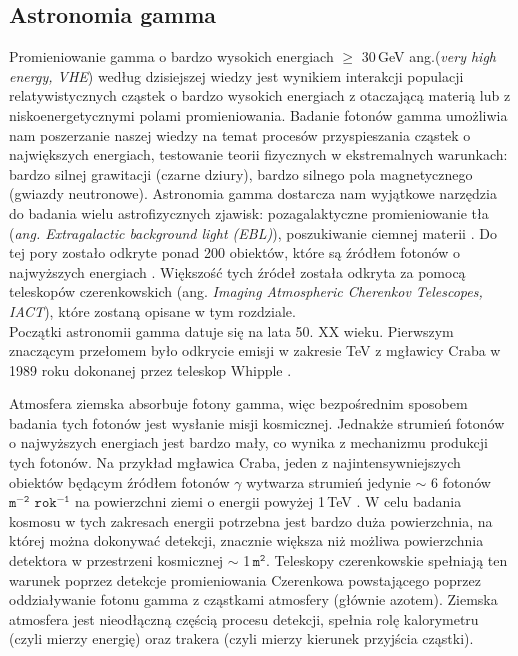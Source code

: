 \documentclass[a4paper,11pt,twoside]{article}
\begin{document}
\subsection{Astronomia gamma}
Promieniowanie gamma o bardzo wysokich energiach $\geq$ 30\,GeV ang.(\textsl{very high energy, VHE}) według dzisiejszej wiedzy jest wynikiem interakcji populacji relatywistycznych cząstek o bardzo wysokich energiach z otaczającą materią lub z niskoenergetycznymi polami promieniowania. Badanie fotonów gamma umożliwia nam poszerzanie naszej wiedzy na temat procesów przyspieszania cząstek o największych energiach, testowanie teorii fizycznych w ekstremalnych warunkach: bardzo silnej grawitacji (czarne dziury), bardzo silnego pola magnetycznego (gwiazdy neutronowe). Astronomia gamma dostarcza nam wyjątkowe narzędzia do badania wielu astrofizycznych zjawisk: pozagalaktyczne promieniowanie tła (\textsl{ang. Extragalactic background light (EBL)}), poszukiwanie ciemnej materii \cite{Gamma-ray_article}. Do tej pory zostało odkryte ponad 200 obiektów, które są źródłem fotonów o najwyższych energiach \cite{TeVCat}. Większość tych źródeł została odkryta za pomocą teleskopów czerenkowskich (ang. \textsl{Imaging Atmospheric Cherenkov Telescopes, IACT}), które zostaną opisane w tym rozdziale.\\
Początki astronomii gamma datuje się na lata 50. XX wieku.
Pierwszym znaczącym przełomem było odkrycie emisji w zakresie TeV z mgławicy Craba w 1989 roku dokonanej przez teleskop Whipple \cite{whipple}.

Atmosfera ziemska absorbuje fotony gamma, więc bezpośrednim sposobem badania tych fotonów jest wysłanie misji kosmicznej. Jednakże strumień fotonów o najwyższych energiach jest bardzo mały, co wynika z mechanizmu produkcji tych fotonów. Na przykład mgławica Craba, jeden z najintensywniejszych obiektów będącym źródłem fotonów $\gamma$ wytwarza strumień jedynie $\sim$ 6 fotonów $\mathtt{m^{-2}}$ $\mathtt{rok^{-1}}$ na powierzchni ziemi o energii powyżej 1\,TeV \cite{IACT}. W celu badania kosmosu w tych zakresach energii potrzebna jest bardzo duża powierzchnia, na której można dokonywać detekcji, znacznie większa niż możliwa powierzchnia detektora w przestrzeni kosmicznej $\sim$ 1\,$\mathtt{m^{2}}$. Teleskopy czerenkowskie spełniają ten warunek poprzez detekcje promieniowania Czerenkowa powstającego poprzez oddziaływanie fotonu gamma z cząstkami atmosfery (głównie azotem). Ziemska atmosfera jest nieodłączną częścią procesu detekcji, spełnia rolę kalorymetru (czyli mierzy energię) oraz trakera (czyli mierzy kierunek przyjścia cząstki). \\
\end{document}
